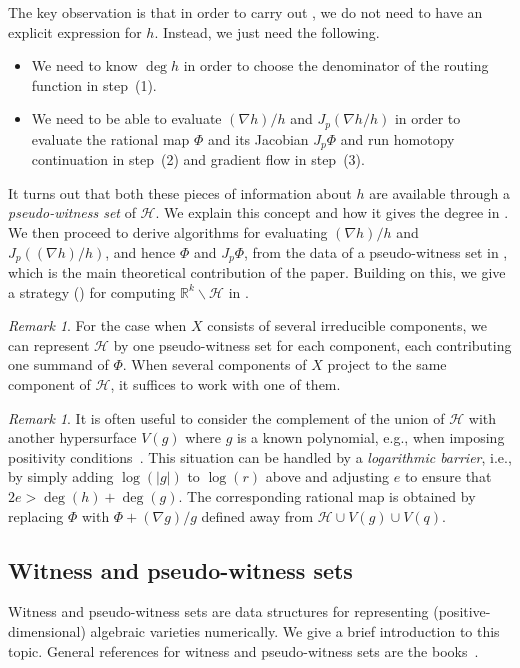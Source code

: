 \documentclass[11pt]{article}
\numberwithin{equation}{section}
\theoremstyle{plain}
\theoremstyle{definition}
\theoremstyle{remark}
\newtheorem{remark}[theorem]{Remark}
\newcommand{\sH}{{\mathcal H}}
\newcommand\bR{{\mathbb R}}
\begin{document}
The key observation is that in order to carry out  , we do not need to have an explicit expression for $h$. Instead, we just need the following.
\begin{itemize}
    \item We need to know $\deg h$ in order to choose the denominator of the routing function in step~(1).
    \item We need to be able to evaluate $(\nabla h)/h$ and $J_{p}(\nabla h/h)$ in order to evaluate the rational map $\Phi$ and its Jacobian $J_{p}\Phi$ and run homotopy continuation in step~(2) and gradient flow in step~(3).
\end{itemize}
It turns out that both these pieces of information about $h$ are available through a  \emph{pseudo-witness set} of $\mathcal{H}$. We explain this concept and how it gives the degree in . We then proceed to derive algorithms for evaluating $(\nabla h)/h$ and $J_{p}((\nabla h)/h)$, and hence $\Phi$ and $J_{p}\Phi$, from the data of a pseudo-witness set in , which is the main theoretical contribution of the paper. Building on this, we give a strategy () for computing $\bR^k\smallsetminus \mathcal{H}$ in .

\begin{remark}\label{rmk:multiple_components}
For the case when $X$ consists of several irreducible components, we can represent  $\mathcal{H}$ by one pseudo-witness set for each component, each contributing one summand of $\Phi$. When several components of $X$ project to the same component of $\mathcal{H}$, it suffices to work with one of them.   
\end{remark}

\begin{remark}\label{extend_h}
It is often useful to consider the complement of
the union of $\sH$ with another hypersurface $V(g)$ 
where $g$ is a known polynomial, 
e.g., when imposing positivity conditions~\cite{SmoothConnectivity,CummingsDahlinGrossHauenstein2025}.  This situation can be handled by a \textit{logarithmic barrier}, i.e., by simply adding $\log(|g|)$ to $\log(r)$ above 
and adjusting $e$ to ensure that $2e>\deg(h)+\deg(g)$. The corresponding rational map is obtained by replacing $\Phi$ with $\Phi + (\nabla g)/g$ defined away from $\sH \cup V(g)\cup V(q)$.
\end{remark}

\subsection{Witness and pseudo-witness sets}\label{sec:pseudo-witness}
Witness and pseudo-witness sets are data structures for representing (positive-dimensional) algebraic varieties numerically. We give a brief introduction to this topic. 
General references for witness and pseudo-witness sets are the books~\cite{BertiniBook,SommeseWamplerBook}.
\end{document}
